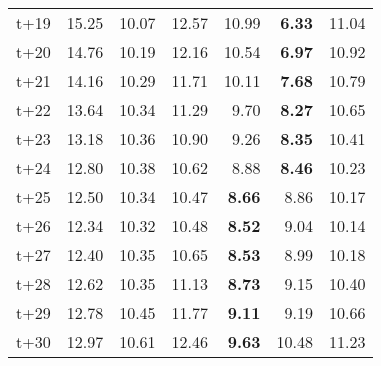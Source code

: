 \begin{table}[H]
\begin{tabular}{lrrrrrr}
t+19  & 15.25  & 10.07  & 12.57  & 10.99  & \textbf{6.33}  & 11.04  \\
t+20  & 14.76  & 10.19  & 12.16  & 10.54  & \textbf{6.97}  & 10.92  \\
t+21  & 14.16  & 10.29  & 11.71  & 10.11  & \textbf{7.68}  & 10.79  \\
t+22  & 13.64  & 10.34  & 11.29  & 9.70  & \textbf{8.27}  & 10.65  \\
t+23  & 13.18  & 10.36  & 10.90  & 9.26  & \textbf{8.35}  & 10.41  \\
t+24  & 12.80  & 10.38  & 10.62  & 8.88  & \textbf{8.46}  & 10.23  \\
t+25  & 12.50  & 10.34  & 10.47  & \textbf{8.66}  & 8.86  & 10.17  \\
t+26  & 12.34  & 10.32  & 10.48  & \textbf{8.52}  & 9.04  & 10.14  \\
t+27  & 12.40  & 10.35  & 10.65  & \textbf{8.53}  & 8.99  & 10.18  \\
t+28  & 12.62  & 10.35  & 11.13  & \textbf{8.73}  & 9.15  & 10.40  \\
t+29  & 12.78  & 10.45  & 11.77  & \textbf{9.11}  & 9.19  & 10.66  \\
t+30  & 12.97  & 10.61  & 12.46  & \textbf{9.63}  & 10.48  & 11.23  \\

\bottomrule
\end{tabular}
\end{table}
